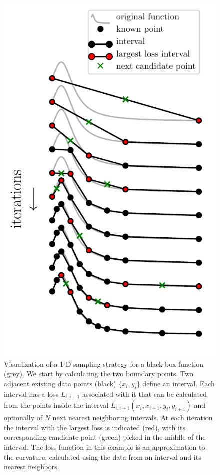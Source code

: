 \begin{figure}
\centering
\includegraphics{chapter_adaptive/figures/algo.pdf}
\caption{Visualization of a 1-D sampling strategy for a black-box function (grey).
We start by calculating the two boundary points.
Two adjacent existing data points (black) $\{x_i, y_i\}$ define an interval.
Each interval has a loss $L_{i,i+1}$ associated with it that can be calculated from the points inside the interval $L_{i,i+1}(x_i, x_{i+1}, y_i, y_{i+1})$ and optionally of $N$ next nearest neighboring intervals.
At each iteration the interval with the largest loss is indicated (red), with its corresponding candidate point (green) picked in the middle of the interval.
The loss function in this example is an approximation to the curvature, calculated using the data from an interval and its nearest neighbors.\label{fig:algo}}
\end{figure}

